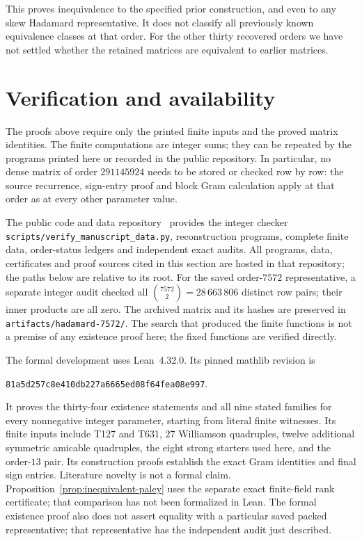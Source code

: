\documentclass[10pt]{article}
\begin{document}
This proves inequivalence to the specified prior construction, and even
to any skew Hadamard representative. It does not classify all previously
known equivalence classes at that order. For the other thirty recovered
orders we have not settled whether the retained matrices are equivalent
to earlier matrices.

\section{Verification and availability}\label{sec:verification}

The proofs above require only the printed finite inputs and the proved
matrix identities. The finite computations are integer sums; they can
be repeated by the programs printed here or recorded in the public
repository. In particular, no dense matrix of
order $291145924$ needs to be stored or checked row by row: the source
recurrence, sign-entry proof and block Gram calculation apply at that
order as at every other parameter value.

The public code and data repository~\cite{butson-towers} provides the integer
checker \texttt{scripts/verify\_manuscript\_data.py}, reconstruction programs,
complete finite data, order-status ledgers and independent exact audits.
All programs, data, certificates and proof sources cited in this section
are hosted in that repository; the paths below are relative to its root.
For the saved order-$7572$ representative, a separate integer audit
checked all $\binom{7572}{2}=28\,663\,806$ distinct row pairs; their
inner products are all zero. The archived matrix and its hashes are
preserved in \texttt{artifacts/hadamard-7572/}.
The search that produced the finite functions is not a premise of any
existence proof here; the fixed functions are verified directly.

The formal development uses Lean~4.32.0. Its pinned mathlib revision is
\begin{center}\small\texttt{81a5d257c8e410db227a6665ed08f64fea08e997}.\end{center}
It proves the thirty-four existence statements and all nine stated families for
every nonnegative integer parameter, starting from literal finite
witnesses. Its finite inputs include T127 and T631, $27$ Williamson
quadruples, twelve additional symmetric amicable quadruples, the eight
strong starters used here, and the
order-$13$ pair. Its construction proofs establish the exact Gram
identities and final sign entries. Literature novelty is not a formal
claim. Proposition~\ref{prop:inequivalent-paley} uses the separate exact
finite-field rank certificate; that comparison has not been formalized
in Lean. The formal existence proof also does not assert equality with a
particular saved packed representative; that representative has the
independent audit just described.
\end{document}
